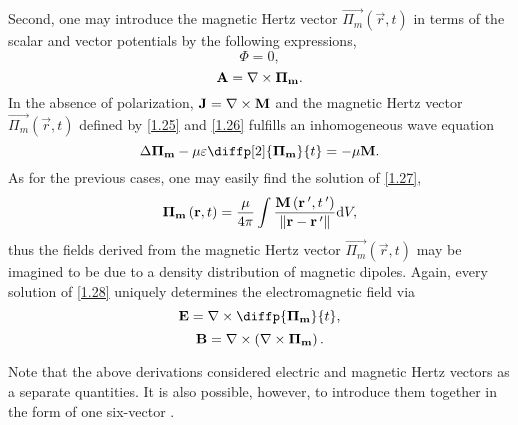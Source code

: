 Second, one may introduce the magnetic Hertz vector $ {\vec{\Pi_m}}\left(\vec{r}, t \right) $ in terms of the scalar and vector potentials by the following expressions,
\begin{equation}
\label{1.25}
\Phi = 0,
\end{equation}
\begin{equation}
\label{1.26}
\mathbf{A} = \nabla \times \mathbf{\Pi_m}.
\end{equation}
In the absence of polarization, $ \mathbf{J} = \nabla \times \mathbf{M} $ and the magnetic Hertz vector $ {\vec{\Pi_m}}\left(\vec{r}, t \right) $ defined by \ref{1.25} and \ref{1.26} fulfills an inhomogeneous wave equation
\begin{equation}
\label{1.27}
\laplace{\vec{\Pi_m}} - \mu \varepsilon \diffp[2]{\vec{\Pi_m}}{t} = -\mu \vec{M}.
\end{equation}
As for the previous cases, one may easily find the solution of \ref{1.27},
\begin{equation}
\label{1.28}
\mathbf{\Pi_m}\left(\mathbf{r}, t \right) = \frac{\mu}{4 \pi} \int \frac{\mathbf{M}\left(\mathbf{r^{\: \prime}}, t^{\: \prime} \right)}{\lVert\mathbf{r} - \mathbf{r^{\: \prime}}\rVert} \mathrm{d} V,
\end{equation}
thus the fields derived from the magnetic Hertz vector $ {\vec{\Pi_m}}\left(\vec{r}, t \right) $ may be imagined to be due to a density distribution of magnetic dipoles. Again, every solution of \ref{1.28} uniquely determines the electromagnetic field via
\begin{equation}
\label{1.29}
\vec{E} = \rot{\diffp{\vec{\Pi_m}}{t}},
\end{equation}
\begin{equation}
\label{1.30}
\mathbf{B} = \nabla \times \left(\nabla \times \mathbf{\Pi_m}\right).
\end{equation}

Note that the above derivations considered electric and magnetic Hertz vectors as a separate quantities. It is also possible, however, to introduce them together in the form of one six-vector \cite{Nisbet1955}.